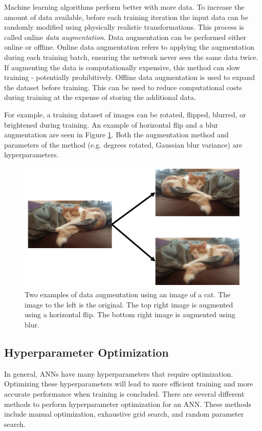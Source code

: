 Machine learning algorithms perform better with more data. To increase the amount of data available, before each training iteration the input data can be randomly modified using physically realistic transformations. This process is called online \textit{data augmentation}. Data augmentation can be performed either online or offline. Online data augmentation refers to applying the augmentation during each training batch, ensuring the network never sees the same data twice. If augmenting the data is computationally expensive, this method can slow training - potentially prohibitively. Offline data augmentation is used to expand the dataset before training. This can be used to reduce computational costs during training at the expense of storing the additional data.

For example, a training dataset of images can be rotated, flipped, blurred, or brightened during training. An example of horizontal flip and a blur augmentation are seen in Figure \ref{fig:cat}. Both the augmentation method and parameters of the method (e.g. degrees rotated, Gaussian blur variance) are hyperparameters.



\begin{figure}[H]
	\centering
	\includegraphics[width=0.9\linewidth]{images/cat}
	\caption{Two examples of data augmentation using an image of a cat. The image to the left is the original. The top right image is augmented using a horizontal flip. The bottom right image is augmented using blur.}
	\label{fig:cat}
\end{figure}

\subsection{Hyperparameter Optimization}

In general, ANNs have many hyperparameters that require optimization. Optimizing these hyperparameters will lead to more efficient training and more accurate performance when training is concluded. There are several different methods to perform hyperparameter optimization for an ANN. These methods include manual optimization, exhaustive grid search, and random parameter search.

